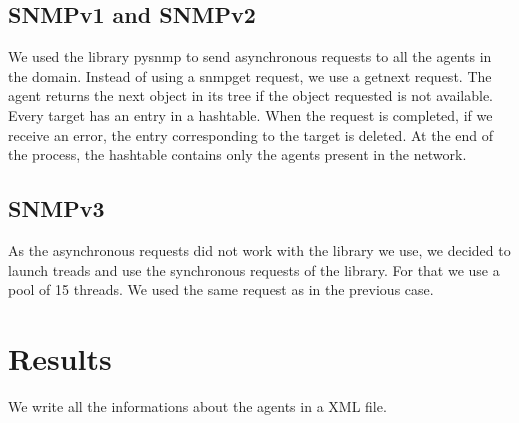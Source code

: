 \documentclass[a4paper,titlepage]{article}
\begin{document}
	\subsection{SNMPv1 and SNMPv2}
	We used the library pysnmp to send asynchronous requests to all the agents in the domain. Instead of using a snmpget request, we use a getnext 
	request. The agent returns the next object in its tree if the object requested is not available. Every target has an entry in a hashtable. When 	the request is completed, if we receive  an error, the entry corresponding to the target is deleted. At the end of the process, the hashtable 		contains only the agents present in the network. 




	\subsection{SNMPv3}
	As the asynchronous requests did not work with the library we use, we decided to launch treads and use the synchronous requests of the library. 
	For that we use a pool of 15 threads.  We used the same request as in the previous case. 



\section{Results}
We write all the informations about the agents in a XML file.
\end{document}

